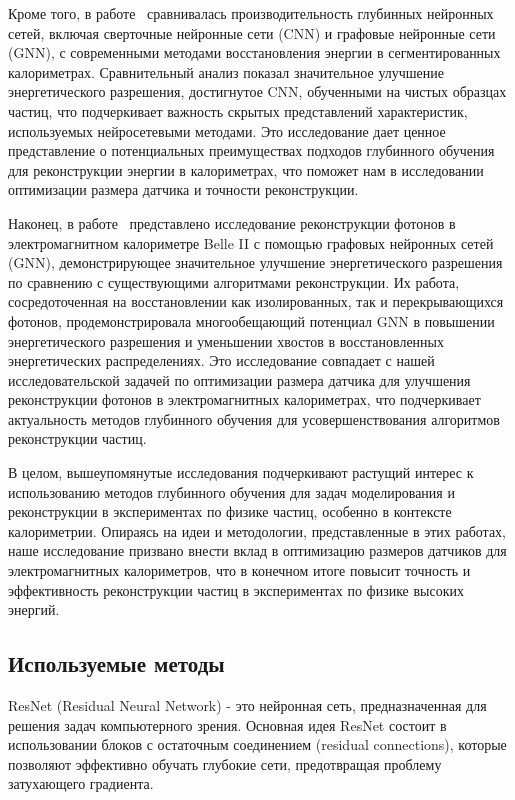 \documentclass[a4paper,12pt]{extarticle}
\begin{document}
Кроме того, в работе~\cite{Akchurin_2021} сравнивалась производительность глубинных нейронных сетей, включая сверточные нейронные сети (CNN) и графовые нейронные сети (GNN), с современными методами восстановления энергии в сегментированных калориметрах. Сравнительный анализ показал значительное улучшение энергетического разрешения, достигнутое CNN, обученными на чистых образцах частиц, что подчеркивает важность скрытых представлений характеристик, используемых нейросетевыми методами. Это исследование дает ценное представление о потенциальных преимуществах подходов глубинного обучения для реконструкции энергии в калориметрах, что поможет нам в исследовании оптимизации размера датчика и точности реконструкции.

Наконец, в работе~\cite{Wemmer_2023} представлено исследование реконструкции фотонов в электромагнитном калориметре Belle II с помощью графовых нейронных сетей (GNN), демонстрирующее значительное улучшение энергетического разрешения по сравнению с существующими алгоритмами реконструкции. Их работа, сосредоточенная на восстановлении как изолированных, так и перекрывающихся фотонов, продемонстрировала многообещающий потенциал GNN в повышении энергетического разрешения и уменьшении хвостов в восстановленных энергетических распределениях. Это исследование совпадает с нашей исследовательской задачей по оптимизации размера датчика для улучшения реконструкции фотонов в электромагнитных калориметрах, что подчеркивает актуальность методов глубинного обучения для усовершенствования алгоритмов реконструкции частиц.

В целом, вышеупомянутые исследования подчеркивают растущий интерес к использованию методов глубинного обучения для задач моделирования и реконструкции в экспериментах по физике частиц, особенно в контексте калориметрии. Опираясь на идеи и методологии, представленные в этих работах, наше исследование призвано внести вклад в оптимизацию размеров датчиков для электромагнитных калориметров, что в конечном итоге повысит точность и эффективность реконструкции частиц в экспериментах по физике высоких энергий.

\subsection{Используемые методы}
\label{subsection:used_methods}

ResNet (Residual Neural Network) - это нейронная сеть, предназначенная для решения задач компьютерного зрения. Основная идея ResNet состоит в использовании блоков с остаточным соединением (residual connections), которые позволяют эффективно обучать глубокие сети, предотвращая проблему затухающего градиента.
\end{document}

